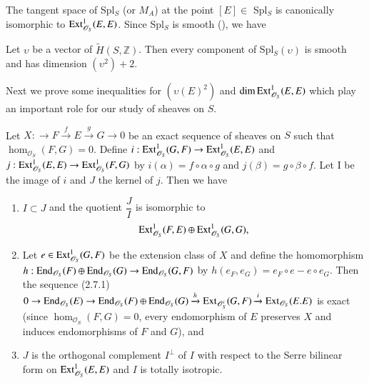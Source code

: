 The tangent space of Spl$_{S}$ (or $M_A$) at the point $[E]\in$
Spl$_S$ is canonically isomorphic to
$\mathrm{Ext}^{1}_{\mathscr{O}_S}(E,E)$. Since Spl$_S$ is smooth
(\cite{key12}), we have 

\begin{cor}\label{cor2.6}
Let $\upsilon$ be a vector of $\widetilde{H}(S,\mathbb{Z})$. Then
every component of Spl$_S(\upsilon)$ is smooth and has dimension
$\left(\upsilon^{2}\right)+2$. 
\end{cor}

Next we prove some inequalities for $\left(\upsilon(E)^{2}\right)$ and
$\dim\mathrm{Ext}^{1}_{\mathscr{O}_S}(E,E)$ which play an important role for
our study of sheaves on $S$. 

\begin{Prop}\label{Prop2.7}
Let $X:\to F\xrightarrow{f} E\xrightarrow{g} G\to 0$ be an exact
sequence of sheaves on $S$ such that
$\hom_{\mathscr{O}_S}(F,G)=0$. Define
$i:\mathrm{Ext}^{1}_{\mathscr{O}_S}(G,F)\to \mathrm{Ext}^{1}_{\mathscr{O}_S}(E,E)$ and
$j:\mathrm{Ext}^{1}_{\mathscr{O}_S}(E,E)\to \mathrm{Ext}^{1}_{\mathscr{O}_S}(F,G)$ by
$i(\alpha)=f\circ \alpha \circ g$ and $j(\beta)=g\circ \beta \circ
f$. Let I be the image of $i$ and $J$ the kernel of $j$. Then we have 
\begin{enumerate}
\renewcommand{\labelenumi}{(\theenumi)}
\item $I\subset J$ and the quotient $\dfrac{J}{I}$ is isomorphic to
$$
\mathrm{Ext}^{1}_{\mathscr{O}_S}(F,E)\oplus \mathrm{Ext}^{1}_{\mathscr{O}_S}(G,G),
$$ 

\item Let $e\in \mathrm{Ext}^{1}_{\mathscr{O}_S}(G,F)$ be the extension class
of $X$ and define the homomorphism $h:\mathrm{End}_{\mathscr{O}_S}(F)\oplus
\mathrm{End}_{\mathscr{O}_S}(G)\to \mathrm{End}_{\mathscr{O}_S}(G,F)$ by $h(e_{F},
e_{G})=e_{F}\circ e-e\circ e_{G}$. Then the sequence (2.7.1) $0\to
\mathrm{End}_{\mathscr{O}_S}(E)\to \mathrm{End}_{\mathscr{O}_S}(F)\oplus
\mathrm{End}_{\mathscr{O}_{S}}(G)\xrightarrow{h} \mathrm{Ext}_{\mathscr{O}_S^i}(G,F)\xrightarrow{i}\mathrm{Ext}_{\mathscr{O}_{S}}\\(E.E)$\pageoriginale
is exact (since $\hom_{\mathscr{O}_S}(F,G)=0$, every endomorphism of
$E$ preserves $X$ and induces endomorphisms of $F$ and $G$), and 
\item $J$ is the orthogonal complement $I^{\perp}$ of $I$ with respect
to the Serre bilinear form on $\mathrm{Ext}^{1}_{\mathscr{O}_S}(E,E)$ and $I$
is totally isotropic. 
\end{enumerate}
\end{Prop}

